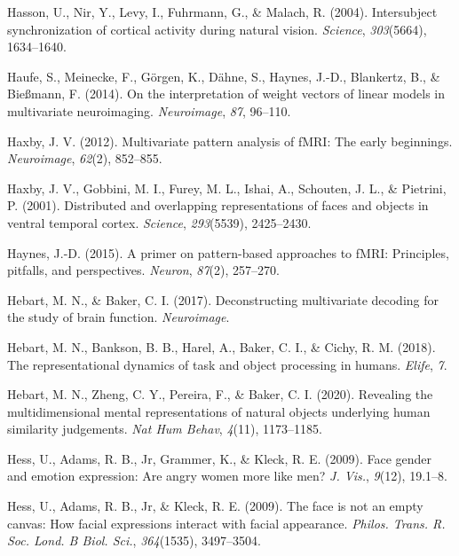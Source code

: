 \documentclass[12pt,american,a4paper,oneside,]{memoir} %
\begin{document}
\leavevmode\hypertarget{ref-Hasson2004-xb}{}%
Hasson, U., Nir, Y., Levy, I., Fuhrmann, G., \& Malach, R. (2004). Intersubject synchronization of cortical activity during natural vision. \emph{Science}, \emph{303}(5664), 1634--1640.

\leavevmode\hypertarget{ref-Haufe2014-el}{}%
Haufe, S., Meinecke, F., Görgen, K., Dähne, S., Haynes, J.-D., Blankertz, B., \& Bießmann, F. (2014). On the interpretation of weight vectors of linear models in multivariate neuroimaging. \emph{Neuroimage}, \emph{87}, 96--110.

\leavevmode\hypertarget{ref-Haxby2012-sd}{}%
Haxby, J. V. (2012). Multivariate pattern analysis of fMRI: The early beginnings. \emph{Neuroimage}, \emph{62}(2), 852--855.

\leavevmode\hypertarget{ref-Haxby2001-os}{}%
Haxby, J. V., Gobbini, M. I., Furey, M. L., Ishai, A., Schouten, J. L., \& Pietrini, P. (2001). Distributed and overlapping representations of faces and objects in ventral temporal cortex. \emph{Science}, \emph{293}(5539), 2425--2430.

\leavevmode\hypertarget{ref-haynes2015primer}{}%
Haynes, J.-D. (2015). A primer on pattern-based approaches to fMRI: Principles, pitfalls, and perspectives. \emph{Neuron}, \emph{87}(2), 257--270.

\leavevmode\hypertarget{ref-Hebart2017-jn}{}%
Hebart, M. N., \& Baker, C. I. (2017). Deconstructing multivariate decoding for the study of brain function. \emph{Neuroimage}.

\leavevmode\hypertarget{ref-Hebart2018-dz}{}%
Hebart, M. N., Bankson, B. B., Harel, A., Baker, C. I., \& Cichy, R. M. (2018). The representational dynamics of task and object processing in humans. \emph{Elife}, \emph{7}.

\leavevmode\hypertarget{ref-Hebart2020-wp}{}%
Hebart, M. N., Zheng, C. Y., Pereira, F., \& Baker, C. I. (2020). Revealing the multidimensional mental representations of natural objects underlying human similarity judgements. \emph{Nat Hum Behav}, \emph{4}(11), 1173--1185.

\leavevmode\hypertarget{ref-Hess2009-jz}{}%
Hess, U., Adams, R. B., Jr, Grammer, K., \& Kleck, R. E. (2009). Face gender and emotion expression: Are angry women more like men? \emph{J. Vis.}, \emph{9}(12), 19.1--8.

\leavevmode\hypertarget{ref-Hess2009-xo}{}%
Hess, U., Adams, R. B., Jr, \& Kleck, R. E. (2009). The face is not an empty canvas: How facial expressions interact with facial appearance. \emph{Philos. Trans. R. Soc. Lond. B Biol. Sci.}, \emph{364}(1535), 3497--3504.
\end{document}
